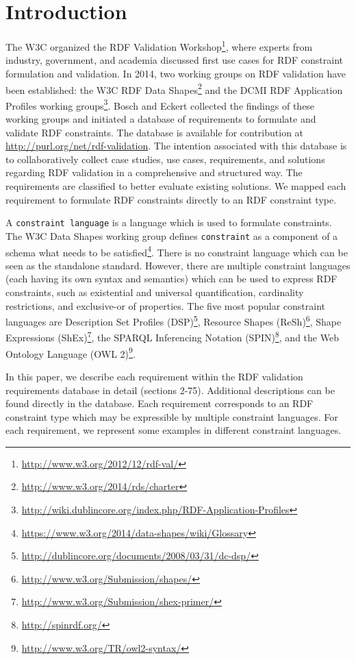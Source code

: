 \documentclass{llncs}
\newcommand{\ms}[1]{\texttt{#1}}
\begin{document}

\section{Introduction}


The W3C organized the RDF Validation Workshop\footnote{\url{http://www.w3.org/2012/12/rdf-val/}}, 
where experts from industry, government, and academia discussed first use cases for RDF constraint formulation and validation.
In 2014, two working groups on RDF validation have been established: 
the W3C RDF Data Shapes\footnote{\url{http://www.w3.org/2014/rds/charter}} and the DCMI RDF Application Profiles working groups\footnote{\url{http://wiki.dublincore.org/index.php/RDF-Application-Profiles}}. 
Bosch and Eckert \cite{BoschEckert2014} collected the findings of these working groups and initiated a database of requirements to formulate and validate RDF constraints.
The database is available for contribution at \url{http://purl.org/net/rdf-validation}.
The intention associated with this database is to collaboratively collect case studies, use cases, requirements, and solutions regarding RDF validation in a comprehensive and structured way. 
The requirements are classified to better evaluate existing solutions. 
We mapped each requirement to formulate RDF constraints directly to an RDF constraint type.

A \ms{constraint language} is a language which is used to formulate constraints.
The W3C Data Shapes working group defines \ms{constraint} as a component of a schema what needs to be satisfied\footnote{\url{https://www.w3.org/2014/data-shapes/wiki/Glossary}}.
There is no constraint language which can be seen as the standalone standard.
However, there are multiple constraint languages (each having its own  syntax and semantics) which can be used to express RDF constraints, such as existential and universal quantification, cardinality restrictions, and exclusive-or of properties.
The five most popular constraint languages are 
Description Set Profiles (DSP)\footnote{\url{http://dublincore.org/documents/2008/03/31/dc-dsp/}},
Resource Shapes (ReSh)\footnote{\url{http://www.w3.org/Submission/shapes/}}, 
Shape Expressions (ShEx)\footnote{\url{http://www.w3.org/Submission/shex-primer/}},
the SPARQL Inferencing Notation (SPIN)\footnote{\url{http://spinrdf.org/}}, 
and the Web Ontology Language (OWL 2)\footnote{\url{http://www.w3.org/TR/owl2-syntax/}}.


In this paper, we describe each requirement within the RDF validation requirements database in detail (sections 2-75).
Additional descriptions can be found directly in the database.
Each requirement corresponds to an RDF constraint type which may be expressible by multiple constraint languages.
For each requirement, we represent some examples in different constraint languages.
\end{document}
